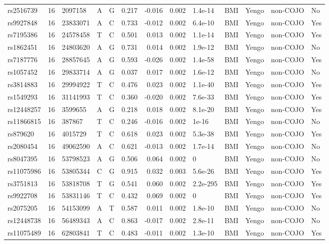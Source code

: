 \documentclass[11pt,twoside]{bristolthesis}
\begin{document}
\begin{longtable}[t]{lrlllrrrlllll}
rs2516739 & 16 & 2097158 & A & G & 0.217 & -0.016 & 0.002 & 1.4e-14 & BMI & Yengo & non-COJO & No\\
rs9927848 & 16 & 23833071 & A & C & 0.733 & -0.012 & 0.002 & 6.4e-10 & BMI & Yengo & non-COJO & Yes\\
\addlinespace
rs7195386 & 16 & 24578458 & T & C & 0.501 & 0.013 & 0.002 & 1.1e-14 & BMI & Yengo & non-COJO & Yes\\
rs1862451 & 16 & 24803620 & A & G & 0.731 & 0.014 & 0.002 & 1.9e-12 & BMI & Yengo & non-COJO & No\\
rs7187776 & 16 & 28857645 & A & G & 0.593 & -0.026 & 0.002 & 1.4e-58 & BMI & Yengo & non-COJO & Yes\\
rs1057452 & 16 & 29833714 & A & G & 0.037 & 0.017 & 0.002 & 1.6e-12 & BMI & Yengo & non-COJO & No\\
rs3814883 & 16 & 29994922 & T & C & 0.476 & 0.023 & 0.002 & 1.1e-40 & BMI & Yengo & non-COJO & Yes\\
\addlinespace
rs1549293 & 16 & 31141993 & T & C & 0.360 & -0.020 & 0.002 & 7.6e-33 & BMI & Yengo & non-COJO & Yes\\
rs12448257 & 16 & 3599655 & A & G & 0.218 & 0.018 & 0.002 & 8.1e-20 & BMI & Yengo & non-COJO & Yes\\
rs11866815 & 16 & 387867 & T & C & 0.246 & -0.016 & 0.002 & 1e-16 & BMI & Yengo & non-COJO & No\\
rs879620 & 16 & 4015729 & T & C & 0.618 & 0.023 & 0.002 & 5.3e-38 & BMI & Yengo & non-COJO & Yes\\
rs2080454 & 16 & 49062590 & A & C & 0.621 & -0.013 & 0.002 & 1.7e-14 & BMI & Yengo & non-COJO & No\\
\addlinespace
rs8047395 & 16 & 53798523 & A & G & 0.506 & 0.064 & 0.002 & 0 & BMI & Yengo & non-COJO & No\\
rs11075986 & 16 & 53805344 & C & G & 0.915 & 0.032 & 0.003 & 5.6e-26 & BMI & Yengo & non-COJO & Yes\\
rs3751813 & 16 & 53818708 & T & G & 0.541 & 0.060 & 0.002 & 2.2e-295 & BMI & Yengo & non-COJO & Yes\\
rs9922708 & 16 & 53831146 & T & C & 0.432 & 0.069 & 0.002 & 0 & BMI & Yengo & non-COJO & Yes\\
rs2075205 & 16 & 54153099 & A & T & 0.587 & 0.011 & 0.002 & 1.8e-10 & BMI & Yengo & non-COJO & No\\
\addlinespace
rs12448738 & 16 & 56489343 & A & C & 0.863 & -0.017 & 0.002 & 2.8e-11 & BMI & Yengo & non-COJO & No\\
rs11075489 & 16 & 62803841 & T & C & 0.483 & -0.011 & 0.002 & 1.3e-10 & BMI & Yengo & non-COJO & Yes\\

\end{longtable}
\end{document}
